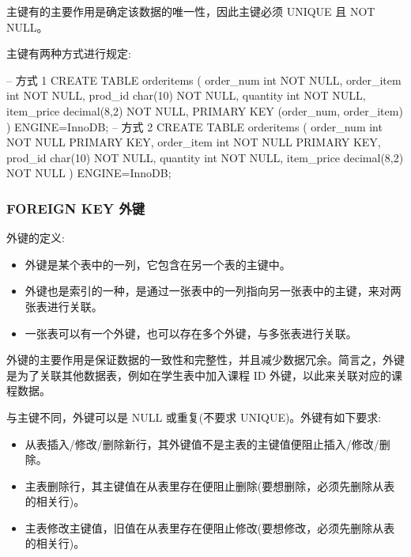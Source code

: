 主键有的主要作用是确定该数据的唯一性，因此主键必须 UNIQUE 且 NOT NULL。

主键有两种方式进行规定:

\begin{sql}
-- 方式 1
CREATE TABLE orderitems
(
  order_num  int          NOT NULL,
  order_item int          NOT NULL,
  prod_id    char(10)     NOT NULL,
  quantity   int          NOT NULL,
  item_price decimal(8,2) NOT NULL,
  PRIMARY KEY (order_num, order_item)
) ENGINE=InnoDB;
-- 方式 2
CREATE TABLE orderitems
(
  order_num  int          NOT NULL  PRIMARY KEY,
  order_item int          NOT NULL  PRIMARY KEY,
  prod_id    char(10)     NOT NULL,
  quantity   int          NOT NULL,
  item_price decimal(8,2) NOT NULL
) ENGINE=InnoDB;
\end{sql}

\subsubsection{FOREIGN KEY 外键}


外键的定义:
\begin{itemize}
    \item 外键是某个表中的一列，它包含在另一个表的主键中。
    \item 外键也是索引的一种，是通过一张表中的一列指向另一张表中的主键，来对两张表进行关联。
    \item 一张表可以有一个外键，也可以存在多个外键，与多张表进行关联。
\end{itemize}

外键的主要作用是保证数据的一致性和完整性，并且减少数据冗余。简言之，外键是为了关联其他数据表，例如在学生表中加入课程 ID 外键，以此来关联对应的课程数据。

与主键不同，外键可以是 NULL 或重复(不要求 UNIQUE)。外键有如下要求:

\begin{itemize}
    \item 从表插入/修改/删除新行，其外键值不是主表的主键值便阻止插入/修改/删除。
    \item 主表删除行，其主键值在从表里存在便阻止删除(要想删除，必须先删除从表的相关行)。
    \item 主表修改主键值，旧值在从表里存在便阻止修改(要想修改，必须先删除从表的相关行)。
\end{itemize}

